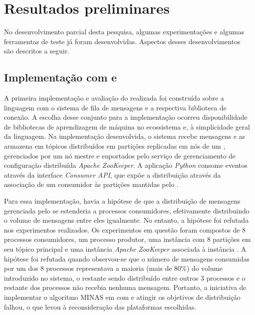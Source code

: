 \section{Resultados preliminares}\label{sec:resultados}

No desenvolvimento parcial desta pesquisa, algumas experimentações e algumas
ferramentas de teste já foram desenvolvidas.
Aspectos desses desenvolvimentos são descritos a seguir.

\subsection{Implementação com \python e \kafka}

A primeira implementação e avaliação do \mfog realizada foi construída sobre a
linguagem \python com o sistema de fila de mensagens \kafka e a respectiva
biblioteca de conexão.
A escolha desse conjunto para a implementação ocorreu 
disponibilidade de bibliotecas de aprendizagem de máquina no ecossistema
\python e, à simplicidade geral da linguagem.
Na implementação desenvolvida, o sistema \kafka recebe mensagens e as armazena
em tópicos distribuídos em partições replicadas em nós de um \cluster,
gerenciados por um nó mestre e suportados pelo serviço de gerenciamento de
configuração distribuída \emph{Apache ZooKeeper}.
A aplicação \emph{Python} consome eventos através da interface \emph{Consumer API},
que expõe a distribuição através da associação de um consumidor às partições
mantidas pelo \kafka.

Para essa implementação, havia a hipótese de que a distribuição de
mensagens gerenciada pelo \kafka
se estenderia a processos consumidores, efetivamente distribuindo o volume de
mensagens entre eles igualmente.
No entanto, a hipótese foi refutada nos experimentos realizados.
Os experimentos em questão foram compostos de 8 processos consumidores, um
processo produtor, uma instância \kafka com 8 partições em seu tópico principal
e uma instância \emph{Apache ZooKeeper} associada à instância \kafka.
A hipótese foi refutada quando observou-se que o número de
mensagens consumidas por um dos 8 processos representava a maioria (mais de
80\%) do volume introduzido no sistema, o restante sendo distribuído entre
outros 3 processos e o restante dos processos não recebia nenhuma mensagem.
Portanto, a iniciativa de implementar o algoritmo MINAS em \python com \kafka e
atingir os objetivos de distribuição falhou, o que levou à reconsideração das
plataformas escolhidas.

